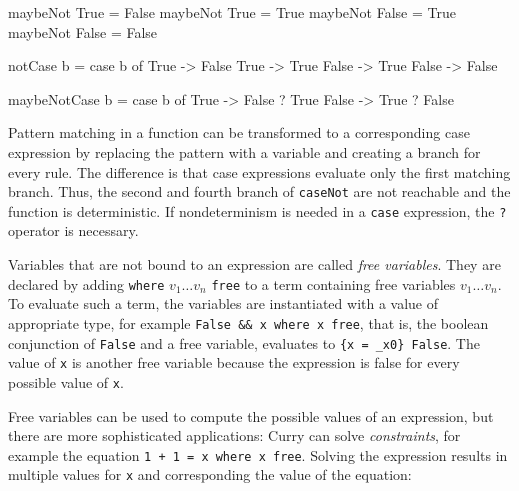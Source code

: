 \documentclass[paper = a4, fleqn, abstract=on, twoside]{scrreprt}
\begin{document}
\begin{flushleft}
\begin{minipage}[t]{.3 \linewidth}
\begin{haskellcode}
maybeNot True  = False
maybeNot True  = True
maybeNot False = True
maybeNot False = False
	\end{haskellcode}
\end{minipage}
\hfill
\vrule
\hfill
\begin{minipage}[t]{.25 \linewidth}
	\begin{haskellcode}
notCase b =
  case b of
    True  -> False
    True  -> True
    False -> True
    False -> False
	\end{haskellcode}
\end{minipage}
\hfill
\vrule
\hfill
\begin{minipage}[t]{.35 \linewidth}
	\begin{haskellcode}
maybeNotCase b =
  case b of
    True  -> False ? True 
    False -> True  ? False
	\end{haskellcode}
\end{minipage}
\end{flushleft}
Pattern matching in a function can be transformed to a corresponding case expression by replacing the pattern with a variable and creating a branch for every rule. The difference is that case expressions evaluate only the first matching branch. Thus, the second and fourth branch of \texttt{caseNot} are not reachable and the function is deterministic. If nondeterminism is needed in a \texttt{case} expression, the \texttt{?} operator is necessary.\\
\par\noindent
Variables that are not bound to an expression are called \textit{free variables}. They are declared by adding \texttt{where} $v_1\dots v_n$ \texttt{free} to a term containing free variables $v_1 \dots v_n$. To evaluate such a term, the variables are instantiated with a value of appropriate type, for example \texttt{False \&\& x where x free}, that is, the boolean conjunction of \texttt{False} and a free variable, evaluates to \texttt{\{x = \_x0\} False}. The value of \texttt{x} is another free variable because the expression is false for every possible value of \texttt{x}.
\par
Free variables can be used to compute the possible values of an expression, but there are more sophisticated applications: Curry can solve \textit{constraints}, for example the equation \texttt{1 + 1 = x where x free}. Solving the expression results in multiple values for \texttt{x} and corresponding the value of the equation:
\end{document}
